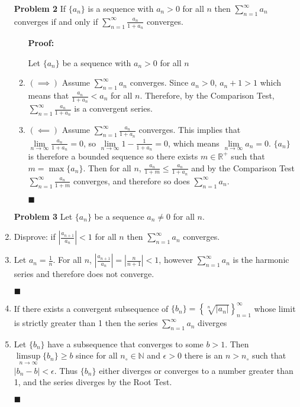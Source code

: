 \documentclass[a4paper,12pt]{report}
\newcommand{\bb}[1]{\mathbb{#1}}
\newcommand{\naught}[1]{{#1}_{\circ}}
\newcommand{\proof}[3]{
	\begin{enumerate}
		\item[\bf{Problem #1}] #2
		\begin{enumerate}
			\item[\textbf{Proof:}]
			#3
			\begin{flushright}
				$\blacksquare$
			\end{flushright}
		\end{enumerate}
	\end{enumerate}
}
\newcommand{\problem}[3]{
	\begin{enumerate}
		\item[\bf{Problem #1}] #2 
		#3
	\end{enumerate}
}
\newcommand{\subproof}[3]{
	\item[#1] #2
	\item[\bf{Proof:}] 
	#3 
	\begin{flushright}
		$\blacksquare$
	\end{flushright}
}
\begin{document}
\proof{2}{
	If $\{a_n\}$ is a sequence with $a_n > 0$ for all $n$ then $\sum\limits_{n=1}^{\infty}a_n$ converges if and only if ${\sum\limits_{n=1}^{\infty}}\frac{a_n}{1 + a_n}$ converges.
}{
	Let $\{a_n\}$ be a sequence with $a_n > 0$ for all $n$
	\item[$(\implies)$]
		Assume $\sum\limits_{n=1}^{\infty}a_n$ converges. Since $a_n > 0$, $a_n + 1 > 1$ which means that $\frac{a_n}{1 + a_n} < a_n$ for all $n$. Therefore, by the Comparison Test, ${\sum\limits_{n=1}^{\infty}}\frac{a_n}{1 + a_n}$ is a convergent series.
	\item[$(\impliedby)$] 
		Assume ${\sum\limits_{n=1}^{\infty}}\frac{a_n}{1 + a_n}$ converges. This implies that $\lim\limits_{n \to \infty}\frac{a_n}{1 + a_n} = 0$, so $\lim\limits_{n \to \infty} 1 - \frac{1}{1 + a_n} = 0$, which means $\lim\limits_{n \to \infty}a_n = 0$. $\{a_n\}$ is therefore a bounded sequence so there exists $m \in \bb{R^+}$ such that $m = \max\{a_n\}$. Then for all $n$, $\frac{a_n}{1 + m} \leqslant \frac{a_n}{1 + a_n}$ and by the Comparison Test $\sum\limits_{n=1}^{\infty}\frac{a_n}{1 + m}$ converges, and therefore so does $\sum\limits_{n=1}^{\infty}a_n$.
}


\problem{3}{
	Let $\{a_n\}$ be a sequence $a_n \neq 0$ for all $n$.
}{
	\subproof{(a)}{
		Disprove: if $\left|\frac{a_{n+1}}{a_n}\right| < 1$ for all $n$ then $\sum\limits_{n=1}^{\infty}a_n$ converges.
	}{
		Let $a_n = \frac{1}{n}$. For all $n$, $\left|\frac{a_{n+1}}{a_n}\right| = \left|\frac{n}{n+1}\right| < 1$, however $\sum\limits_{n=1}^{\infty}a_n$ is the harmonic series and therefore does not converge.
	}
	
	\subproof{(b)}{
		If there exists a convergent subsequence of $\{b_n\} = \left\{\sqrt[n]{|a_n|}\right\}_{n=1}^{\infty}$ whose limit is strictly greater than 1 then the series $\sum\limits_{n=1}^{\infty}a_n$ diverges
	}{
		Let $\{b_n\}$ have a subsequence that converges to some $b > 1$. Then $\limsup\limits_{n \to \infty}\{b_n\} \geqslant b$ since for all $\naught{n} \in \bb{N}$ and $\epsilon > 0$ there is an $n > \naught{n}$ such that $|b_n - b| < \epsilon$. Thus $\{b_n\}$ either diverges or converges to a number greater than 1, and the series diverges by the Root Test.
	}
}

\pagebreak
\end{document}
